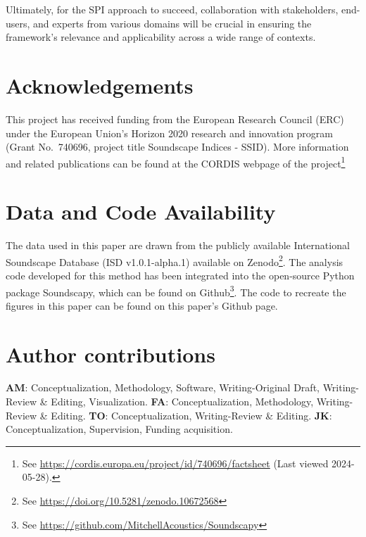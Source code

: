 \documentclass[
  authoryear,
  preprint,
  3p]{elsarticle}
\begin{document}
Ultimately, for the SPI approach to succeed, collaboration with
stakeholders, end-users, and experts from various domains will be
crucial in ensuring the framework's relevance and applicability across a
wide range of contexts.

\section*{Acknowledgements}\label{acknowledgements}

This project has received funding from the European Research Council
(ERC) under the European Union's Horizon 2020 research and innovation
program (Grant No.~740696, project title Soundscape Indices - SSID).
More information and related publications can be found at the CORDIS
webpage of the project\footnote{See
  \url{https://cordis.europa.eu/project/id/740696/factsheet} (Last
  viewed 2024-05-28).}

\section*{Data and Code Availability}\label{data-and-code-availability}

The data used in this paper are drawn from the publicly available
International Soundscape Database (ISD v1.0.1-alpha.1)
\citet{Mitchell2024International} available on Zenodo\footnote{See
  \url{https://doi.org/10.5281/zenodo.10672568}}. The analysis code
developed for this method has been integrated into the open-source
Python package Soundscapy, which can be found on Github\footnote{See
  \url{https://github.com/MitchellAcoustics/Soundscapy}}. The code to
recreate the figures in this paper can be found on this paper's Github
page.

\section*{Author contributions}\label{author-contributions}

\textbf{AM}: Conceptualization, Methodology, Software, Writing-Original
Draft, Writing-Review \& Editing, Visualization. \textbf{FA}:
Conceptualization, Methodology, Writing-Review \& Editing. \textbf{TO}:
Conceptualization, Writing-Review \& Editing. \textbf{JK}:
Conceptualization, Supervision, Funding acquisition.


\renewcommand\refname{References}
  
\end{document}
